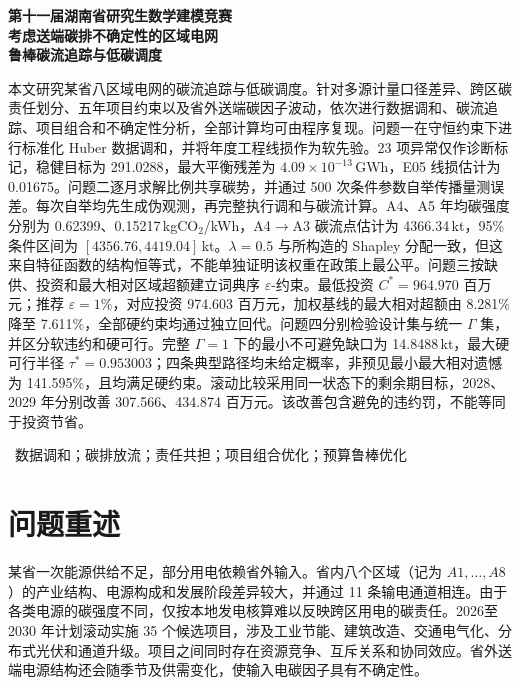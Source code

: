 \documentclass[UTF8,a4paper,zihao=-4,fontset=fandol]{ctexart}
\begin{document}
\begin{center}
{\heiti{}\bfseries 第十一届湖南省研究生数学建模竞赛}\\[1.4em]
{\heiti{}\bfseries 考虑送端碳排不确定性的区域电网}\\[0.35em]
{\heiti{}\bfseries 鲁棒碳流追踪与低碳调度}
\end{center}
\vspace{1.1em}

\quad
本文研究某省八区域电网的碳流追踪与低碳调度。针对多源计量口径差异、跨区碳责任划分、五年项目约束以及省外送端碳因子波动，依次进行数据调和、碳流追踪、项目组合和不确定性分析，全部计算均可由程序复现。问题一在守恒约束下进行标准化 Huber 数据调和，并将年度工程线损作为软先验。23 项异常仅作诊断标记，稳健目标为 291.0288，最大平衡残差为 $4.09\times10^{-13}$\,GWh，E05 线损估计为 0.01675。问题二逐月求解比例共享碳势，并通过 500 次条件参数自举传播量测误差。每次自举均先生成伪观测，再完整执行调和与碳流计算。A4、A5 年均碳强度分别为 0.62399、0.15217\,kgCO$_2$/kWh，A4$\to$A3 碳流点估计为 4366.34\,kt，95\% 条件区间为 $[4356.76,4419.04]$\,kt。$\lambda=0.5$ 与所构造的 Shapley 分配一致，但这来自特征函数的结构恒等式，不能单独证明该权重在政策上最公平。问题三按缺供、投资和最大相对区域超额建立词典序 $\varepsilon$-约束。最低投资 $C^*=964.970$ 百万元；推荐 $\varepsilon=1\%$，对应投资 974.603 百万元，加权基线的最大相对超额由 8.281\% 降至 7.611\%，全部硬约束均通过独立回代。问题四分别检验设计集与统一 $\Gamma$ 集，并区分软违约和硬可行。完整 $\Gamma=1$ 下的最小不可避免缺口为 14.8488\,kt，最大硬可行半径 $\tau^*=0.953003$；四条典型路径均未给定概率，非预见最小最大相对遗憾为 141.595\%，且均满足硬约束。滚动比较采用同一状态下的剩余期目标，2028、2029 年分别改善 307.566、434.874 百万元。该改善包含避免的违约罚，不能等同于投资节省。

\vspace{0.6em}
\ 数据调和；碳排放流；责任共担；项目组合优化；预算鲁棒优化

\newpage

\section{问题重述}

某省一次能源供给不足，部分用电依赖省外输入。省内八个区域（记为 $A1,\ldots,A8$）的产业结构、电源构成和发展阶段差异较大，并通过 11 条输电通道相连。由于各类电源的碳强度不同，仅按本地发电核算难以反映跨区用电的碳责任。2026至2030 年计划滚动实施 35 个候选项目，涉及工业节能、建筑改造、交通电气化、分布式光伏和通道升级。项目之间同时存在资源竞争、互斥关系和协同效应。省外送端电源结构还会随季节及供需变化，使输入电碳因子具有不确定性。
\end{document}
